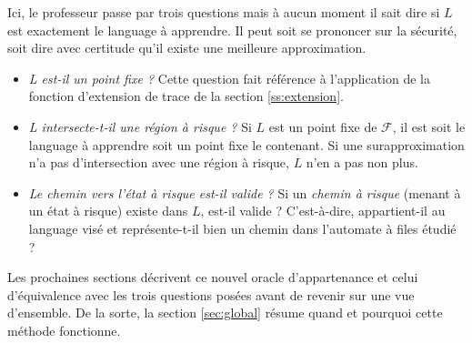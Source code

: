 Ici, le professeur passe par trois questions mais à aucun moment il sait dire si $L$ est exactement le language à apprendre. Il peut soit se prononcer sur la sécurité, soit dire avec certitude qu'il existe une meilleure approximation.

\begin{itemize}
	\item \emph{L est-il un point fixe ?} Cette question fait référence à l'application de la fonction d'extension de trace de la section \ref{ss:extension}.
	\item \emph{L intersecte-t-il une région à risque ?} Si $L$ est un point fixe de $\mathcal{F}$, il est soit le language à apprendre soit un point fixe le contenant. Si une surapproximation n'a pas d'intersection avec une région à risque, $L$ n'en a pas non plus.
	\item \emph{Le chemin vers l'état à risque est-il valide ?} Si un \emph{chemin à risque} (menant à un état à risque) existe dans $L$, est-il valide ? C'est-à-dire, appartient-il au language visé et représente-t-il bien un chemin dans l'automate à files étudié ?
\end{itemize}

Les prochaines sections décrivent ce nouvel oracle d'appartenance et celui d'équivalence avec les trois questions posées avant de revenir sur une vue d'ensemble. De la sorte, la section \ref{sec:global} résume quand et pourquoi cette méthode fonctionne.

